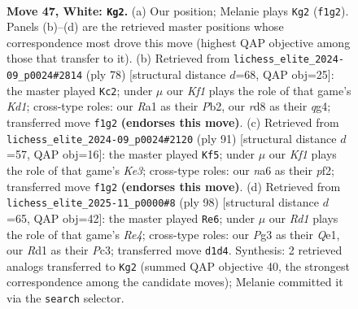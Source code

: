 \documentclass[11pt]{article}
\begin{document}
\clearpage

\begin{figure}[p]\centering
\begin{subfigure}{0.46\textwidth}\centering
\resizebox{\linewidth}{!}{%
\newchessgame
\chessboard[
  setfen={3r2k1/p7/np1P4/4Qp1q/P1p5/6P1/1P6/R2R1K2 w - - 0 47},
  showmover=false,
  pgfstyle=straightmove, color=movearrow, markmove={f1-g2}
]}
\caption{}
\end{subfigure}\hfill
\begin{subfigure}{0.46\textwidth}\centering
\resizebox{\linewidth}{!}{%
\newchessgame
\chessboard[
  setfen={5rk1/1p6/1N1p4/1R1P4/6q1/6P1/1P3p2/3K1Q2 w - - 6 40},
  showmover=false,
  pgfstyle=straightmove, color=movearrow, markmove={d1-c2}
]}
\caption{}
\end{subfigure}
\\[4pt]
\begin{subfigure}{0.46\textwidth}\centering
\resizebox{\linewidth}{!}{%
\newchessgame
\chessboard[
  setfen={6Q1/1p2r2p/1P2kp2/8/4p2P/3q2P1/5P2/4R1K1 b - - 8 46},
  showmover=false,
  pgfstyle=straightmove, color=movearrow, markmove={e6-f5}
]}
\caption{}
\end{subfigure}\hfill
\begin{subfigure}{0.46\textwidth}\centering
\resizebox{\linewidth}{!}{%
\newchessgame
\chessboard[
  setfen={5rk1/1r5p/1P1p2p1/3P4/1R2RP2/p1P5/2q5/K3Q3 w - - 7 50},
  showmover=false,
  pgfstyle=straightmove, color=movearrow, markmove={e4-e6}
]}
\caption{}
\end{subfigure}
\caption{\textbf{Move 47, White: \texttt{Kg2}.} (a) Our position; Melanie plays \texttt{Kg2} (\texttt{f1g2}). Panels (b)--(d) are the retrieved master positions whose correspondence most drove this move (highest QAP objective among those that transfer to it). (b) Retrieved from \texttt{lichess\_elite\_2024-09\_p0024\#2814} (ply 78) [structural distance $d$=68, QAP obj=25]: the master played \texttt{Kc2}; under $\mu$ our \emph{Kf1} plays the role of that game's \emph{Kd1}; cross-type roles: our \emph{R}a1 as their \emph{P}b2, our \emph{r}d8 as their \emph{q}g4; transferred move \texttt{f1g2} \textbf{(endorses this move)}. (c) Retrieved from \texttt{lichess\_elite\_2024-09\_p0024\#2120} (ply 91) [structural distance $d$=57, QAP obj=16]: the master played \texttt{Kf5}; under $\mu$ our \emph{Kf1} plays the role of that game's \emph{Ke3}; cross-type roles: our \emph{n}a6 as their \emph{p}f2; transferred move \texttt{f1g2} \textbf{(endorses this move)}. (d) Retrieved from \texttt{lichess\_elite\_2025-11\_p0000\#8} (ply 98) [structural distance $d$=65, QAP obj=42]: the master played \texttt{Re6}; under $\mu$ our \emph{Rd1} plays the role of that game's \emph{Re4}; cross-type roles: our \emph{P}g3 as their \emph{Q}e1, our \emph{R}d1 as their \emph{P}c3; transferred move \texttt{d1d4}. Synthesis: 2 retrieved analogs transferred to \texttt{Kg2} (summed QAP objective 40, the strongest correspondence among the candidate moves); Melanie committed it via the \texttt{search} selector.}
\label{fig:thought-m92}
\end{figure}
\end{document}

